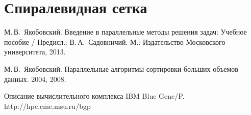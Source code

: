 \documentclass[oneside,final,14pt]{extreport}
\begin{document}
\newpage
\section*{Спиралевидная сетка}

\begin{thebibliography}{0}
        М.\,В.~Якобовский.
        Введение в параллельные методы решения задач: Учебное пособие / Предисл.: В.\,А.~Садовничий.
        М.: Издательство Московского университета, 2013.

        М.\,В.~Якобовский.
        Параллельные алгоритмы сортировки больших объемов данных.
        2004, 2008.

        Описание вычислительного комплекса IBM Blue Gene/P.
        http://hpc.cmc.msu.ru/bgp
\end{thebibliography}

\newpage
\appendix
\end{document}
